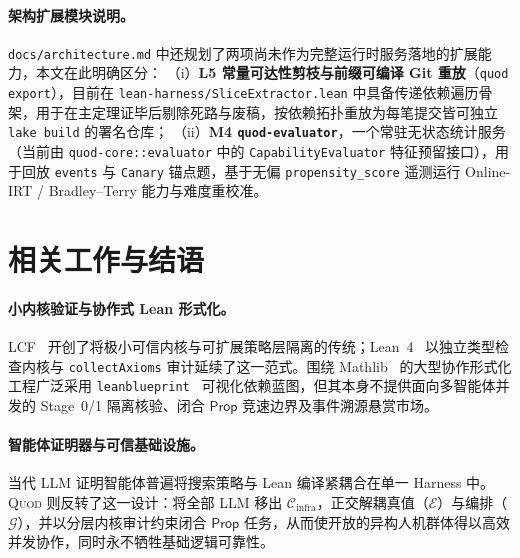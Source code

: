 \documentclass[10pt,a4paper,fontset=fandol]{ctexart}
\newcommand{\Cinfra}{\mathcal{C}_{\mathrm{infra}}}
\newcommand{\Truth}{\mathcal{E}}
\newcommand{\Orch}{\mathcal{G}}
\newcommand{\Prop}{\mathsf{Prop}}
\newcommand{\code}[1]{\texttt{#1}}
\begin{document}
\paragraph{架构扩展模块说明。}
\code{docs/architecture.md} 中还规划了两项尚未作为完整运行时服务落地的扩展能力，本文在此明确区分：
（i）\textbf{L5 常量可达性剪枝与前缀可编译 Git 重放}（\code{quod export}），目前在 \code{lean-harness/\-SliceExtractor.lean} 中具备传递依赖遍历骨架，用于在主定理证毕后剔除死路与废稿，按依赖拓扑重放为每笔提交皆可独立 \code{lake build} 的署名仓库；
（ii）\textbf{M4 \code{quod-evaluator}}，一个常驻无状态统计服务（当前由 \code{quod-core::\-evaluator} 中的 \code{CapabilityEvaluator} 特征预留接口），用于回放 \code{events} 与 \code{Canary} 锚点题，基于无偏 \code{propensity\_score} 遥测运行 Online-IRT / Bradley--Terry 能力与难度重校准。

\section{相关工作与结语}\label{sec:related}

\paragraph{小内核验证与协作式 Lean 形式化。}
LCF~\cite{gordon1979edinburgh} 开创了将极小可信内核与可扩展策略层隔离的传统；Lean~4~\cite{demoura2021lean4} 以独立类型检查内核与 \code{collectAxioms} 审计延续了这一范式。围绕 Mathlib~\cite{mathlib2020} 的大型协作形式化工程广泛采用 \code{leanblueprint}~\cite{massot2024blueprint} 可视化依赖蓝图，但其本身不提供面向多智能体并发的 Stage~0/1 隔离核验、闭合 $\Prop$ 竞速边界及事件溯源悬赏市场。

\paragraph{智能体证明器与可信基础设施。}
当代 LLM 证明智能体普遍将搜索策略与 Lean 编译紧耦合在单一 Harness 中。\textsc{Quod} 则反转了这一设计：将全部 LLM 移出 $\Cinfra$，正交解耦真值（$\Truth$）与编排（$\Orch$），并以分层内核审计约束闭合 $\Prop$ 任务，从而使开放的异构人机群体得以高效并发协作，同时永不牺牲基础逻辑可靠性。
\end{document}
